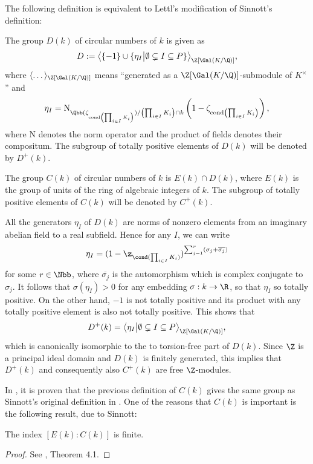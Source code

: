 The following definition is equivalent to Lettl's modification of Sinnott's definition:
\begin{definition}
The group $D(k)$ of circular numbers of $k$ is given as
$$D:=\big\langle \{-1\} \cup \{\eta_I \big\vert \emptyset \subsetneq I \subseteq P \}\big\rangle_{\Z[\Gal(K/\Q)]},$$
where $\langle \dots \rangle_{\Z[\Gal(K/\Q)]}$ means \enquote{generated as a $\Z[\Gal(K/\Q)]$-submodule of $K^{\times}$} and $$\eta_I=\text{N}_{\Qbb(\zeta_{\text{cond} \left(\prod_{i\in I}K_i\right)})/\left(\prod_{i\in I}K_i\right)\cap k}\left(1-\zeta_{\text{cond} \left(\prod_{i\in I}K_i\right)}\right),$$ where $\text{N}$ denotes the norm operator and the product of fields denotes their compositum. The subgroup of totally positive elements of $D(k)$ will be denoted by $D^+(k)$.
\end{definition}

\begin{definition}
The group $C(k)$ of circular numbers of $k$ is $E(k)\cap D(k)$, where $E(k)$ is the group of units of the ring of algebraic integers of $k$. The subgroup of totally positive elements of $C(k)$ will be denoted by $C^+(k)$.
\end{definition}

\begin{rem}
All the generators $\eta_I$ of $D(k)$ are norms of nonzero elements from an imaginary abelian field to a real subfield. Hence for any $I$, we can write 
$$\eta_I=(1-\z_{\cond(\prod_{i\in I}K_i)})^{\sum_{j=1}^r(\sigma_j+\overline{\sigma_j})}$$
for some $r\in\Nbb$, where $\overline{\sigma_j}$ is the automorphism which is complex conjugate to $\sigma_j$. It follows that $\sigma(\eta_I)>0$ for any embedding $\sigma:k\to \R$, so that $\eta_I$ so totally positive. On the other hand, $-1$ is not totally positive and its product with any totally positive element is also not totally positive. This shows that $$D^+(k)=\big\langle  \eta_I \big\vert \emptyset \subsetneq I \subseteq P\big\rangle_{\Z[\Gal(K/\Q)]},$$
which is canonically isomorphic to the to torsion-free part of $D(k)$. Since $\Z$ is a principal ideal domain and $D(k)$ is finitely generated, this implies that $D^+(k)$ and consequently also $C^+(k)$ are free $\Z$-modules.
\end{rem}

In \citep{Lettl1990}, it is proven that the previous definition of $C(k)$ gives the same group as Sinnott's original definition in \citep{SinnottAb}. One of the reasons that $C(k)$ is important is the following result, due to Sinnott:
\begin{theorem}\label{finind}
The index $[E(k):C(k)]$ is finite.
\end{theorem}
\begin{proof}
See \citep{SinnottAb}, Theorem 4.1.
\end{proof}

